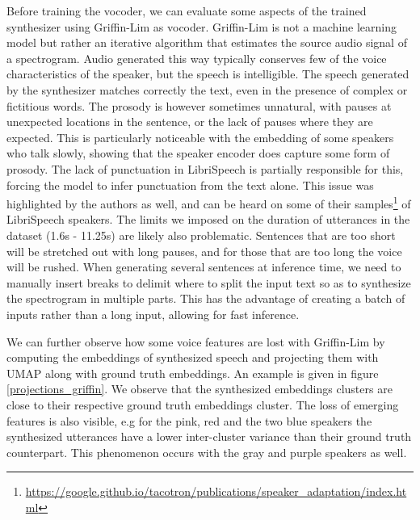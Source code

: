 \documentclass[a4paper, oneside, 12pt, english]{article}
\begin{document}
Before training the vocoder, we can evaluate some aspects of the trained synthesizer using Griffin-Lim \citep{GriffinLim} as vocoder. Griffin-Lim is not a machine learning model but rather an iterative algorithm that estimates the source audio signal of a spectrogram. Audio generated this way typically conserves few of the voice characteristics of the speaker, but the speech is intelligible. The speech generated by the synthesizer matches correctly the text, even in the presence of complex or fictitious words. The prosody is however sometimes unnatural, with pauses at unexpected locations in the sentence, or the lack of pauses where they are expected. This is particularly noticeable with the embedding of some speakers who talk slowly, showing that the speaker encoder does capture some form of prosody. The lack of punctuation in LibriSpeech is partially responsible for this, forcing the model to infer punctuation from the text alone. This issue was highlighted by the authors as well, and can be heard on some of their samples\footnote{\url{https://google.github.io/tacotron/publications/speaker_adaptation/index.html}} of LibriSpeech speakers. The limits we imposed on the duration of utterances in the dataset (1.6s - 11.25s) are likely also problematic. Sentences that are too short will be stretched out with long pauses, and for those that are too long the voice will be rushed. When generating several sentences at inference time, we need to manually insert breaks to delimit where to split the input text so as to synthesize the spectrogram in multiple parts. This has the advantage of creating a batch of inputs rather than a long input, allowing for fast inference.

We can further observe how some voice features are lost with Griffin-Lim by computing the embeddings of synthesized speech and projecting them with UMAP along with ground truth embeddings. An example is given in figure \ref{projections_griffin}. We observe that the synthesized embeddings clusters are close to their respective ground truth embeddings cluster. The loss of emerging features is also visible, e.g for the pink, red and the two blue speakers the synthesized utterances have a lower inter-cluster variance than their ground truth counterpart. This phenomenon occurs with the gray and purple speakers as well.
\end{document}
